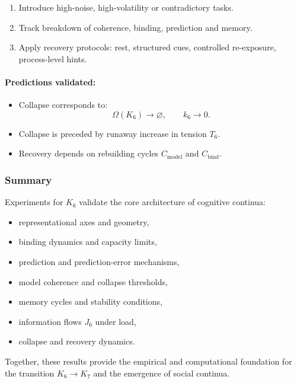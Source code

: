 \begin{enumerate}
    \item Introduce high-noise, high-volatility or contradictory tasks.
    \item Track breakdown of coherence, binding, prediction and memory.
    \item Apply recovery protocols: rest, structured cues, 
          controlled re-exposure, process-level hints.
\end{enumerate}

\paragraph{Predictions validated:}

\begin{itemize}
    \item Collapse corresponds to:
          \[
             \Omega(K_6) \rightarrow \varnothing,
             \qquad k_6 \rightarrow 0.
          \]
    \item Collapse is preceded by runaway increase in tension $T_6$.
    \item Recovery depends on rebuilding cycles $C_{\mathrm{model}}$ 
          and $C_{\mathrm{bind}}$.
\end{itemize}



\subsubsection{Summary}

Experiments for $K_6$ validate the core architecture of cognitive continua:

\begin{itemize}
    \item representational axes and geometry,
    \item binding dynamics and capacity limits,
    \item prediction and prediction-error mechanisms,
    \item model coherence and collapse thresholds,
    \item memory cycles and stability conditions,
    \item information flows $J_6$ under load,
    \item collapse and recovery dynamics.
\end{itemize}

Together, these results provide the empirical and computational
foundation for the transition $K_6 \rightarrow K_7$ and the
emergence of social continua.
